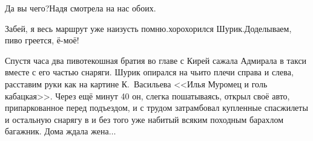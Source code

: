\diagdash Да вы чего?\mdash Надя смотрела на нас обоих.

\diagdash Забей, я весь маршрут уже наизусть помню.\mdash хорохорился Шурик.\mdash Доделываем, пиво греется, ё-моё!

Спустя часа два пивотекошная братия во главе с Кирей сажала Адмирала в такси вместе с его частью снаряги. Шурик опирался на чьи\sdash то плечи справа и слева, расставим руки как на картине К.~Васильева <<Илья Муромец и голь кабацкая>>. Через ещё минут 40 он, слегка пошатываясь, открыл своё авто, припаркованное перед подъездом, и с трудом затрамбовал купленные спасжилеты и остальную снарягу в и без того уже набитый всяким походным барахлом багажник. Дома ждала жена$\ldots$

\begin{center}
\end{center}
